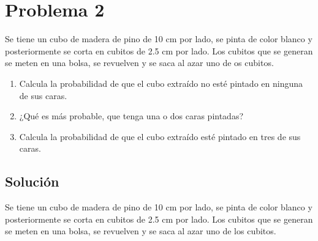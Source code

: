 \documentclass[titlepage]{article} %
\begin{document}
    \section*{\Large Problema 2}

\Large Se tiene un cubo de madera de pino de 10 cm por lado, se pinta de color blanco y posteriormente se corta en cubitos de 2.5 cm por lado. Los cubitos que se generan se meten en una bolsa, se revuelven y se saca al azar uno de os cubitos.

\begin{enumerate}
    \item Calcula la probabilidad de que el cubo extraído no esté pintado en ninguna de sus caras.
    \item ¿Qué es más probable, que tenga una o dos caras pintadas?
    \item Calcula la probabilidad de que el cubo extraído esté pintado en tres de sus caras. 
\end{enumerate}

\subsection*{\Large Solución}

\Large
Se tiene un cubo de madera de pino de 10 cm por lado, se pinta de color blanco y posteriormente se corta en cubitos de 2.5 cm por lado. Los cubitos que se generan se meten en una bolsa, se revuelven y se saca al azar uno de los cubitos.
\end{document}
